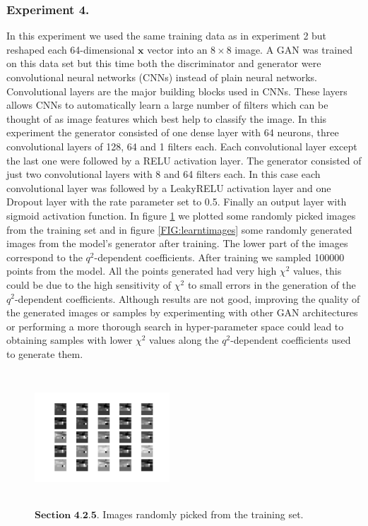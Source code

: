 \documentclass[a4paper,fleqn]{cas-dc}
\begin{document}
\subsubsection{Experiment 4. }
In this experiment we used the same training data as in experiment 2 but reshaped each 64-dimensional \(\boldsymbol{x}\) vector into an \(8\times8\) image. A GAN was trained on this data set but this time both the discriminator and generator were convolutional neural networks (CNNs) instead of plain neural networks. Convolutional layers are the major building blocks used in CNNs. These layers allows CNNs to automatically learn a large number of filters which can be thought of as image features which best help to classify the image. In this experiment the generator consisted of one dense layer with 64 neurons, three convolutional layers of 128, 64 and 1 filters each. Each convolutional layer except the last one were followed by a RELU activation layer. The generator consisted of just two convolutional layers with 8 and 64 filters each. In this case each convolutional layer was followed by a LeakyRELU activation layer and one Dropout layer with the rate parameter set to 0.5. Finally an output layer with sigmoid activation function. In figure \ref{FIG:trainingimages} we plotted some randomly picked images from the training set and in figure \ref{FIG:learntimages} some randomly generated images from the model's generator after training. The lower part of the images correspond to the \(q^2\)-dependent coefficients.  After training we sampled 100000 points from the model. All the points generated had very high \(\chi^2 \) values, this could be due to the high sensitivity of \(\chi^2 \) to small errors in the generation of the \(q^2\)-dependent coefficients. Although results are not good, improving the quality of the generated images or samples by experimenting with other GAN architectures or performing a more thorough search in hyper-parameter space could lead to obtaining samples with lower \(\chi^2 \) values along the \(q^2 \)-dependent coefficients used to generate them.
\begin{figure}
	\centering
	\includegraphics[width=0.45\textwidth,height=5cm]{images/trainingimages.pdf}
	\caption{\(\textbf{Section 4.2.5}.\) Images randomly picked from the training set.}
	\label{FIG:trainingimages}
\end{figure}
\end{document}
